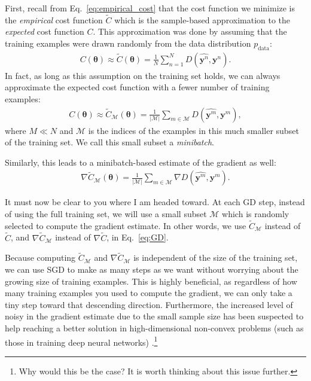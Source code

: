 \documentclass{report}
\newcommand{\vect}[1]{\mathbf{#1}}
\newcommand{\vects}[1]{\boldsymbol{#1}}
\newcommand{\vy}[0]{\vect{y}}
\newcommand{\TT}[0]{\vects{\theta}}
\newcommand{\MM}[0]{\mathcal{M}}
\begin{document}
First, recall from Eq.~\eqref{eq:empirical_cost} that the cost function we
minimize is the {\em empirical} cost function $\tilde{C}$ which is the
sample-based approximation to the {\em expected} cost function $C$. This
approximation was done by assuming that the training examples were drawn
randomly from the data distribution $p_{\text{data}}$:
\begin{align*}
    C(\TT) \approx \tilde{C}(\TT) = \frac{1}{N} \sum_{n=1}^N D(\hat{\vy^{n}},
    \vy^{n}).
\end{align*}
In fact, as long as this assumption on the training set holds, we can always
approximate the expected cost function with a fewer number of training examples:
\begin{align*}
    C(\TT) \approx \tilde{C}_\MM (\TT) = \frac{1}{|\MM|} \sum_{m \in \MM}
    D(\hat{\vy^{m}}, \vy^m),
\end{align*}
where $M \ll N$ and $\MM$ is the indices of the examples in this much smaller
subset of the training set. We call this small subset a {\em minibatch}.

Similarly, this leads to a minibatch-based estimate of the gradient as well:
\begin{align*}
    \nabla \tilde{C}_\MM (\TT) = \frac{1}{|\MM|} \sum_{m \in \MM} \nabla
    D(\hat{\vy^m}, \vy^m).
\end{align*}

It must now be clear to you where I am headed toward. At each GD step, instead
of using the full training set, we will use a small subset $\MM$ which is
randomly selected to compute the gradient estimate. In other words, we use
$\tilde{C}_\MM$ instead of $\tilde{C}$, and $\nabla \tilde{C}_\MM$ instead of
$\nabla \tilde{C}$, in Eq.~\eqref{eq:GD}. 

Because computing $\tilde{C}_\MM$ and $\nabla \tilde{C}_\MM$ is independent of
the size of the training set, we can use SGD to make as many steps as we want
without worrying about the growing size of training examples. This is highly
beneficial, as regardless of how many training examples you used to compute the
gradient, we can only take a tiny step toward that descending direction.
Furthermore, the increased level of noisy in the gradient estimate due to the
small sample size has been suspected to help reaching a better solution in 
high-dimensional non-convex problems (such as those in training deep neural
networks) \cite{Lecun1998a}.\footnote{
    Why would this be the case? It is worth thinking about this issue further.
}
\end{document}
